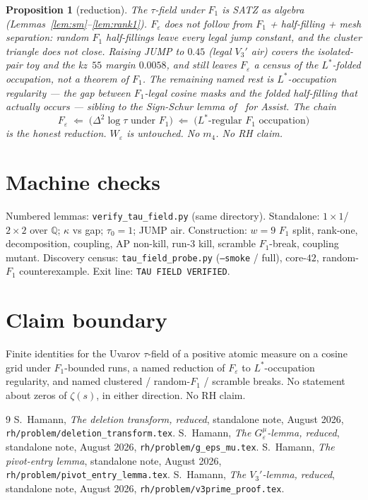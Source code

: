 \documentclass[11pt]{article}
\newtheorem{prop}{Proposition}
\theoremstyle{remark}
\newcommand{\Q}{\mathbb{Q}}
\newcommand{\eps}{\varepsilon}
\begin{document}
\begin{prop}[reduction]\label{prop:red}
The $\tau$-field under $F_1$ is SATZ as algebra
(Lemmas~\ref{lem:sm}--\ref{lem:rank1}).
$F_\eps$ does \emph{not} follow from $F_1$ + half-filling + mesh
separation: random $F_1$ half-fillings leave every legal jump
constant, and the cluster triangle does not close.
Raising JUMP to $0.45$ (legal $V_3'$ air) covers the isolated-pair
toy and the kz~$55$ margin $0.0058$, and still leaves $F_\eps$ a
census of the $L^*$-folded occupation, not a theorem of $F_1$.
The remaining named rest is $L^*$-occupation regularity --- the
gap between $F_1$-legal cosine masks and the folded half-filling
that actually occurs --- sibling to the Sign-Schur lemma of~\cite{r392}
for Assist.
The chain
\[
F_\eps
\;\Longleftarrow\;
\bigl(\Delta^2\log\tau\text{ under }F_1\bigr)
\;\Longleftarrow\;
\bigl(L^*\text{-regular }F_1\text{ occupation}\bigr)
\]
is the honest reduction.
$W_\eps$ is untouched.
No $m_4$.  No RH claim.
\end{prop}

\section{Machine checks}\label{sec:machine}

Numbered lemmas: \texttt{verify\_tau\_field.py} (same directory).
Standalone: $1\times1$/$2\times2$ over $\Q$; $\kappa$ vs gap;
$\tau_0=1$; JUMP air.
Construction: $w=9$ $F_1$ split, rank-one, decomposition, coupling,
AP non-kill, run-$3$ kill, scramble $F_1$-break, coupling mutant.
Discovery census: \texttt{tau\_field\_probe.py}
(\texttt{--smoke} / full), core-$42$, random-$F_1$ counterexample.
Exit line: \texttt{TAU FIELD VERIFIED}.

\section*{Claim boundary}

Finite identities for the Uvarov $\tau$-field of a positive atomic
measure on a cosine grid under $F_1$-bounded runs, a named
reduction of $F_\eps$ to $L^*$-occupation regularity, and named
clustered / random-$F_1$ / scramble breaks.
No statement about zeros of $\zeta(s)$, in either direction.
No RH claim.

\begin{thebibliography}{9}
S.~Hamann,
\textit{The deletion transform, reduced},
standalone note, August 2026,
\texttt{rh/problem/deletion\_transform.tex}.
S.~Hamann,
\textit{The $G_\varepsilon^\mu$-lemma, reduced},
standalone note, August 2026,
\texttt{rh/problem/g\_eps\_mu.tex}.
S.~Hamann,
\textit{The pivot-entry lemma},
standalone note, August 2026,
\texttt{rh/problem/pivot\_entry\_lemma.tex}.
S.~Hamann,
\textit{The $V_3'$-lemma, reduced},
standalone note, August 2026,
\texttt{rh/problem/v3prime\_proof.tex}.
\end{thebibliography}
\end{document}
